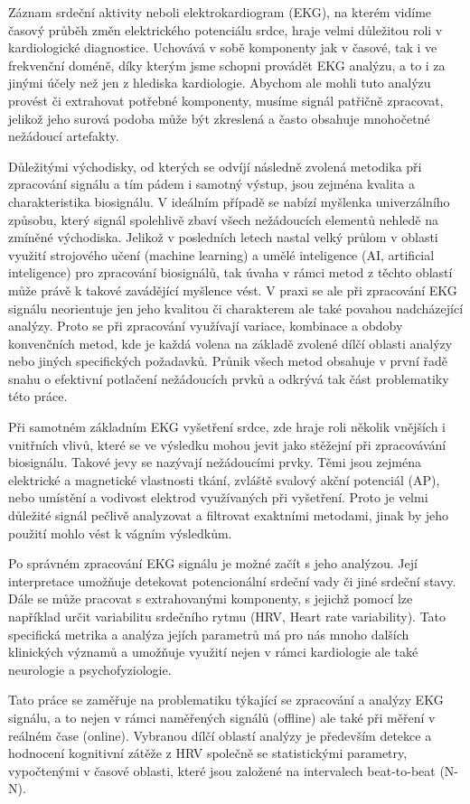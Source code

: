 Záznam srdeční aktivity neboli elektrokardiogram (EKG), na kterém vidíme časový
průběh změn elektrického potenciálu srdce, hraje velmi důležitou roli v
kardiologické diagnostice. Uchovává v sobě komponenty jak v časové, tak i ve
frekvenční doméně, díky kterým jsme schopni provádět EKG analýzu, a to i za
jinými účely než jen z hlediska kardiologie. Abychom ale mohli tuto analýzu
provést či extrahovat potřebné komponenty, musíme signál patřičně zpracovat,
jelikož jeho surová podoba může být zkreslená a často obsahuje mnohočetné
nežádoucí artefakty.

Důležitými východisky, od kterých se odvíjí následně zvolená metodika při
zpracování signálu a tím pádem i samotný výstup, jsou zejména kvalita a
charakteristika biosignálu. V ideálním případě se nabízí myšlenka univerzálního
způsobu, který signál spolehlivě zbaví všech nežádoucích elementů nehledě na
zmíněné východiska. Jelikož v posledních letech nastal velký průlom v oblasti
využití strojového učení (machine learning) a umělé inteligence (AI, artificial
inteligence) pro zpracování biosignálů, tak úvaha v rámci metod z těchto oblastí
může právě k takové zavádějící myšlence vést. V praxi se ale při zpracování EKG
signálu neorientuje jen jeho kvalitou či charakterem ale také povahou
nadcházející analýzy. Proto se při zpracování využívají variace, kombinace a
obdoby konvenčních metod, kde je každá volena na základě zvolené dílčí oblasti
analýzy nebo jiných specifických požadavků. Průnik všech metod obsahuje v první
řadě snahu o efektivní potlačení nežádoucích prvků a odkrývá tak část
problematiky této práce.

Při samotném základním EKG vyšetření srdce, zde hraje roli několik vnějších i
vnitřních vlivů, které se ve výsledku mohou jevit jako stěžejní při zpracovávání
biosignálu. Takové jevy se nazývají nežádoucími prvky. Těmi jsou zejména
elektrické a magnetické vlastnosti tkání, zvláště svalový akční potenciál (AP),
nebo umístění a vodivost elektrod využívaných při vyšetření. Proto je velmi
důležité signál pečlivě analyzovat a filtrovat exaktními metodami, jinak by jeho
použití mohlo vést k vágním výsledkům. 

Po správném zpracování EKG signálu je možné začít s jeho analýzou. Její
interpretace umožňuje detekovat potencionální srdeční vady či jiné srdeční
stavy. Dále se může pracovat s extrahovanými komponenty, s jejichž pomocí
lze například určit variabilitu srdečního rytmu (HRV, Heart rate variability).
Tato specifická metrika a analýza jejích parametrů má pro nás mnoho dalších
klinických významů a umožňuje využití nejen v rámci kardiologie ale také
neurologie a psychofyziologie.

Tato práce se zaměřuje na problematiku týkající se zpracování a analýzy EKG
signálu, a to nejen v rámci naměřených signálů (offline) ale také při měření v
reálném čase (online). Vybranou dílčí oblastí analýzy je především detekce a
hodnocení kognitivní zátěže z HRV společně se statistickými parametry,
vypočtenými v časové oblasti, které jsou založené na intervalech beat-to-beat
(N-N).
